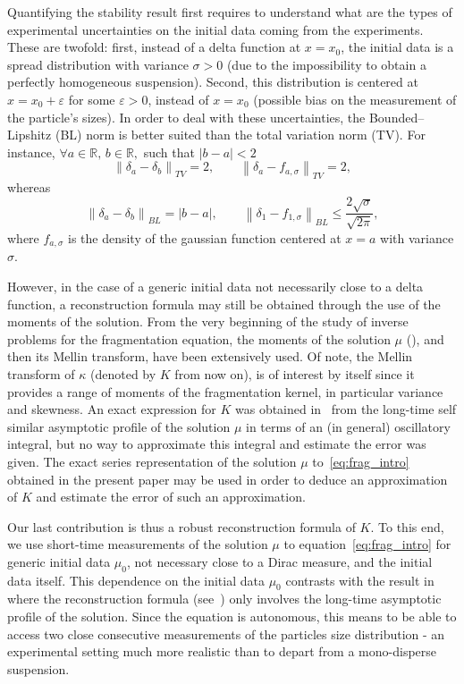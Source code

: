 \documentclass[10pt]{amsart}
\theoremstyle{definition}\newtheorem{defi}[theo]{Definition}\newtheorem{rema}[theo]{Remark}\newtheorem{exam}[theo]{Example}\newtheorem{exem}[theo]{Example}\newtheorem{nota}[theo]{Notation}
\newcommand*\eps{\varepsilon}
\newcommand*\R{\mathbb{R}}
\newcommand*\f{\frac}
\let\oldforall\forall
\renewcommand*{\forall}{\mathrel{\oldforall}}
\begin{document}
Quantifying the stability result first requires to understand what are the types of experimental uncertainties on the initial data coming from the experiments. These are twofold: first, instead of a delta function at $x=x_0$, the initial data is a spread distribution with variance $\sigma>0$ (due to the impossibility to obtain a perfectly homogeneous suspension). Second, this distribution is centered at $x=x_0+\eps$ for some $\eps>0$, instead of $x=x_0$ (possible bias on the measurement of the particle's
sizes). In order to deal with these uncertainties, the Bounded--Lipshitz (BL) norm is better suited than the total variation norm (TV). For instance, $\forall a\in \R,\,b\in \R,$ such that $|b-a| <2$
\begin{equation*}
\left\|\delta_{a}-\delta_b \right\|_{TV} =2,\qquad \left\|\delta_{a}-f_{a,\sigma}\right\|_{TV} =2,
\end{equation*}
whereas
\begin{equation*}
\left\|\delta_{a}-\delta_b \right\|_{BL} =|b-a|,\qquad \left\|\delta_{1}-f_{1,\sigma} \right\|_{BL} \leq\f{2\sqrt{\sigma}}{\sqrt{2\pi}},
\end{equation*}
where $f_{a,\sigma}$ is the density of the gaussian function centered at $x=a$ with variance $\sigma$.

However, in the case of a generic initial data not necessarily close to a delta function, a reconstruction formula may still be obtained through the use of the moments of the solution. From the very beginning of the study of inverse problems for the fragmentation equation, the moments of the solution $\mu $ (\cite{NRamG80,Ram74}), and then its Mellin transform, have been extensively used. Of note, the Mellin transform of $\kappa $ (denoted by $K$ from now on), is of interest by itself since it provides a range of moments of the fragmentation kernel, in particular variance and skewness. An exact expression for $K$ was obtained in~\cite{DET18} from the long-time self similar asymptotic profile of the solution $\mu $ in terms of an (in general) oscillatory integral, but no way to approximate this integral and estimate the error was given. The exact series representation of the solution $\mu $ to~\eqref{eq:frag_intro} obtained in the present paper may be used in order to deduce an approximation of $K$ and estimate the error of such an approximation.

Our last contribution is thus a robust reconstruction formula of $K$. To this end, we use short-time measurements of the solution $\mu $ to equation~\eqref{eq:frag_intro} for generic initial data $\mu _0$, not necessary close to a Dirac measure, and the initial data itself. This dependence on the initial data $\mu _0$ contrasts with the result in~\cite{DET18} where the reconstruction formula (see~\cite[Theorem~2]{DET18}) only involves the long-time asymptotic profile of the solution. Since the equation is autonomous, this means to be able to access two close consecutive measurements of the particles size distribution - an experimental setting much more realistic than to depart from a mono-disperse suspension.
\end{document}

